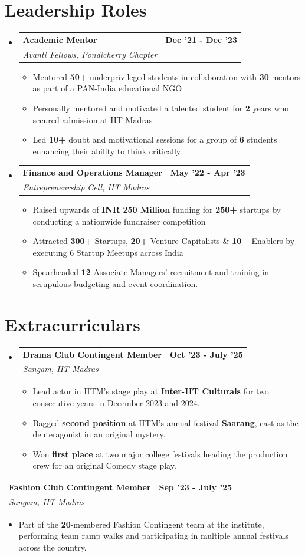 \documentclass[letterpaper,10pt]{article}
\makeatletter
\newcommand{\resumeItem}[1]{
  \item\small{
    {#1 \vspace{0pt}}
  }
}
\newcommand{\resumeSubheading}[4]{
  \vspace{-1pt}\item
    \begin{tabular*}{1.0\textwidth}[t]{l@{\extracolsep{\fill}}r}
      \textbf{#1} & \textbf{\small #2} \\
      \textit{\small#3} & \textit{\small #4} \\
    \end{tabular*}\vspace{-4pt}
}
\newcommand{\resumeSubHeadingListStart}{\begin{itemize}[leftmargin=0.0in, label={}]}
\newcommand{\resumeSubHeadingListEnd}{\end{itemize}}
\newcommand{\resumeItemListStart}{\begin{itemize}[leftmargin=0.15in]}
\newcommand{\resumeItemListEnd}{\end{itemize}\vspace{-6pt}}
\makeatother
\begin{document}
\section{\Large{Leadership Roles}}
    \resumeSubHeadingListStart
    \resumeSubheading{Academic Mentor}{Dec '21 - Dec '23}{Avanti Fellows, Pondicherry Chapter}{}
    \resumeItemListStart
        \resumeItem{Mentored \textbf{50+} underprivileged students in collaboration with \textbf{30} mentors as part of a PAN-India educational NGO}
        \resumeItem{Personally mentored and motivated a talented student for \textbf{2} years who secured admission at IIT Madras}
        \resumeItem{Led \textbf{10+} doubt and motivational sessions for a group of \textbf{6} students enhancing their ability to think critically}
    \resumeItemListEnd
    \resumeSubheading{Finance and Operations Manager}{May '22 - Apr '23}{Entrepreneurship Cell, IIT Madras}{ }
    \resumeItemListStart
        \resumeItem{Raised upwards of \textbf{INR 250 Million} funding for \textbf{250+} startups by conducting a nationwide fundraiser competition}
        \resumeItem{Attracted \textbf{300+} Startups, \textbf{20+} Venture Capitalists \& \textbf{10+} Enablers by executing 6 Startup Meetups across India}
        \resumeItem{Spearheaded \textbf{12} Associate Managers’ recruitment and training in scrupulous budgeting and event coordination.}
    \resumeItemListEnd
    \resumeSubHeadingListEnd
\vspace{-12pt}

\section{\Large{Extracurriculars}}
    \resumeSubHeadingListStart
    \resumeSubheading{Drama Club Contingent Member}{Oct '23 - July '25 }{Sangam, IIT Madras}{}
    \begin{itemize}
    \itemsep0em
    \item{Lead actor in IITM's stage play at \textbf{Inter-IIT Culturals} for two consecutive years in December 2023 and 2024.}
    \item{Bagged \textbf{second position} at IITM's annual festival \textbf{Saarang}, cast as the deuteragonist in an original mystery.}
    \item{Won \textbf{first place} at two major college festivals heading the production crew for an original Comedy stage play.}
    \end{itemize}
    \resumeSubHeadingListEnd
    \vspace{-8pt}
    \resumeSubheading{Fashion Club Contingent Member}{Sep '23 - July '25 }{Sangam, IIT Madras}{}
    \begin{itemize}
    \item{Part of the \textbf{20}-membered Fashion Contingent team at the institute, performing team ramp walks and participating in multiple annual festivals across the country.}
    \end{itemize}
\end{document}
